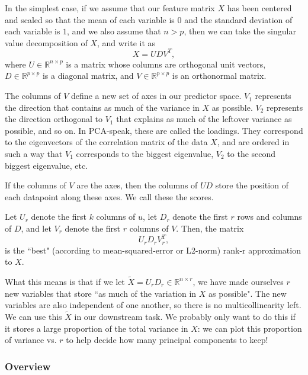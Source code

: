 In the simplest case, if we assume that our feature matrix $X$ has been centered and scaled so that the mean of each variable is $0$ and the standard deviation of each variable is $1$, and we also assume that $n > p$, then we can take the singular value decomposition of $X$, and write it as 
$$
X = U D V^T, 
$$
where $U \in \mathbb{R}^{n \times p}$ is a matrix whose columns are orthogonal unit vectors, $D \in \mathbb{R}^{p \times p}$ is a diagonal matrix, and $V \in \mathbb{R}^{p \times p}$ is an orthonormal matrix. 

The columns of $V$ define a new set of axes in our predictor space. $V_1$ represents the direction that contains as much of the variance in $X$ as possible. $V_2$ represents the direction orthogonal to $V_1$ that explains as much of the leftover variance as possible, and so on. In PCA-speak, these are called the loadings. They correspond to the eigenvectors of the correlation matrix of the data $X$, and are ordered in such a way that $V_1$ corresponds to the biggest eigenvalue, $V_2$ to the second biggest eigenvalue, etc. 

If the columns of $V$ are the axes, then the columns of $U D$ store the position of each datapoint along these axes. We call these the scores. 

Let $U_{r}$ denote the first $k$ columns of $u$, let $D_r$ denote the first $r$ rows and columns of $D$, and let $V_r$ denote the first $r$ columns of $V$. Then, the matrix
$$
U_r D_r V_r^T, 
$$
is the ``best" (according to mean-squared-error or L2-norm) rank-r approximation to $X$. 

What this means is that if we let $\tilde{X} = U_r D_r \in \mathbb{R}^{n \times r}$, we have made ourselves $r$ new variables that store ``as much of the variation in $X$ as possible". The new variables are also independent of one another, so there is no multicollinearity left. We can use this $\tilde{X}$ in our downstream task. We probably only want to do this if it stores a large proportion of the total variance in $X$: we can plot this proportion of variance vs. $r$ to help decide how many principal components to keep! 



\subsubsection{Overview}

